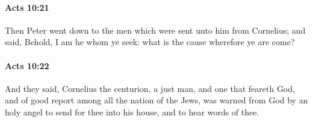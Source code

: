 		\paragraph{Acts 10:21} %
			\label{ACTS-10-21}

			Then Peter went down to the men which were sent unto him from Cornelius; and said, Behold, I am he whom ye seek: what is the cause wherefore ye are come?

			\begin{framed}
			\scriptsize
				\begin{compactdesc}
					\item[SBLG] 
				\end{compactdesc}
			\end{framed}

		\paragraph{Acts 10:22} %
			\label{ACTS-10-22}

			And they said, Cornelius the centurion, a just man, and one that feareth God, and of good report among all the nation of the Jews, was warned from God by an holy angel to send for thee into his house, and to hear words of thee.


